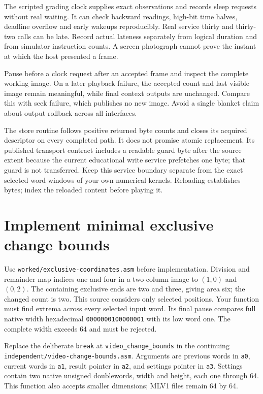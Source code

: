 The scripted grading clock supplies exact observations and records sleep
requests without real waiting. It can check backward readings, high-bit time
halves, deadline overflow and early wakeups reproducibly. Real service thirty
and thirty-two calls can be late. Record actual lateness separately from
logical duration and from simulator instruction counts. A screen photograph
cannot prove the instant at which the host presented a frame.

Pause before a clock request after an accepted frame and inspect the complete
working image. On a later playback failure, the accepted count and last visible
image remain meaningful, while final context outputs are unchanged. Compare
this with seek failure, which publishes no new image. Avoid a single blanket
claim about output rollback across all interfaces.

The store routine follows positive returned byte counts and closes its acquired
descriptor on every completed path. It does not promise atomic replacement.
Its published transport contract includes a readable guard byte after the source
extent because the current educational write service prefetches one byte; that
guard is not transferred. Keep this service boundary separate from the exact
selected-word windows of your own numerical kernels. Reloading establishes bytes;
index the reloaded content before playing it.

\section{Implement minimal exclusive change bounds}

Use \texttt{worked/exclusive-coordinates.asm} before implementation. Division
and remainder map indices one and four in a two-column image to $(1,0)$ and
$(0,2)$. The containing exclusive ends are two and three, giving area six;
the changed count is two. This source considers only selected positions. Your
function must find extrema across every selected input word. Its final pause
compares full native width hexadecimal \texttt{0000000100000001} with its low
word one. The complete width exceeds 64 and must be rejected.

Replace the deliberate \texttt{break} at \texttt{video\_change\_bounds} in the
continuing \texttt{independent/video-change-bounds.asm}. Arguments are previous words in \texttt{a0}, current words in
\texttt{a1}, result pointer in \texttt{a2}, and settings pointer in
\texttt{a3}. Settings contain two native unsigned doublewords, width and height,
each one through 64. This function also accepts smaller dimensions; MLV1 files remain 64 by 64.

